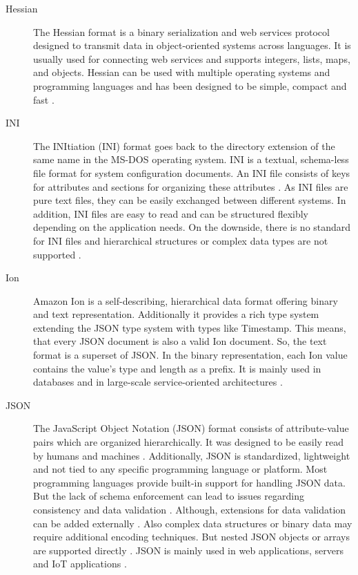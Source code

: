 \documentclass[10pt]{IEEEtran}
\begin{document}
\begin{description}
    \item[Hessian] The Hessian format is a binary serialization and web services protocol designed to transmit data in object-oriented systems across languages. It is usually used for connecting web services and supports integers, lists, maps, and objects. Hessian can be used with multiple operating systems and programming languages and has been designed to be simple, compact and fast \cite{caucho_2007}.
    \item[INI] The INItiation (INI) format goes back to the directory extension of the same name in the MS-DOS operating system. INI is a textual, schema-less file format for system configuration documents.  An INI file consists of keys for attributes and sections for organizing these attributes \cite{cheema_2021}. As INI files are pure text files, they can be easily exchanged between different systems. In addition, INI files are easy to read and can be structured flexibly depending on the application needs. On the downside, there is no standard for INI files and hierarchical structures or complex data types are not supported \cite{editorial_team_2023}.
    \item[Ion]  Amazon Ion is a self-describing, hierarchical data format offering binary and text representation. Additionally it provides a rich type system extending the JSON type system with types like Timestamp. This means, that every JSON document is also a valid Ion document. So, the text format is a superset of JSON. In the binary representation, each Ion value contains the value's type and length as a prefix. It is mainly used in databases and in large-scale service-oriented architectures \cite{amazon_2024}.
    \item[JSON]  The JavaScript Object Notation (JSON) format consists of attribute-value pairs which are organized hierarchically. It was designed to be easily read by humans and machines \cite{kaur_2020}. Additionally, JSON is standardized, lightweight and not tied to any specific programming language or platform. Most programming languages provide built-in support for handling JSON data. But the lack of schema enforcement can lead to issues regarding consistency and data validation \cite{klimenko_2024}. Although, extensions for data validation can be added externally \cite{jsonschema_2024}. Also complex data structures or binary data may require additional encoding techniques. But nested JSON objects or arrays are supported directly \cite{klimenko_2024}. JSON is mainly used in web applications, servers and IoT applications \cite{lysogor_2018}. 

\end{description}
\end{document}
